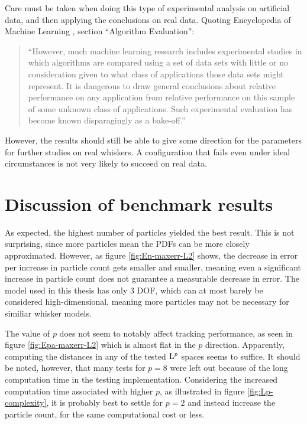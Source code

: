 

Care must be taken when doing this type of experimental analysis on
artificial data, and then applying the conclusions on real
data. Quoting Encyclopedia of Machine Learning
\cite{EncyclopediaMachineLearning}, section ``Algorithm Evaluation'':

\begin{quote}
  ``However, much machine learning research includes experimental
  studies in which algorithms are compared using a set of data sets
  with little or no consideration given to what class of applications
  those data sets might represent. It is dangerous to draw general
  conclusions about relative performance on any application from
  relative performance on this sample of some unknown class of
  applications. Such experimental evaluation has become known
  disparagingly as a bake-off.''
\end{quote}

However, the results should still be able to give some direction for
the parameters for further studies on real whiskers. A configuration
that fails even under ideal circumstances is not very likely to
succeed on real data.

\section{Discussion of benchmark results}
As expected, the highest number of particles yielded the best
result. This is not surprising, since more particles mean the PDFs can
be more closely approximated. However, as figure \ref{fig:En-maxerr-L2}
shows, the decrease in error per increase in particle count gets
smaller and smaller, meaning even a significant increase in particle
count does not guarantee a measurable decrease in error. The model
used in this thesis has only 3 DOF, which can at most barely be
considered high-dimensional, meaning more particles may not be
necessary for similiar whisker models.

The value of $p$ does not seem to notably affect tracking performance,
as seen in figure \ref{fig:Epa-maxerr-L2} which is almost flat in the
$p$ direction. Apparently, computing the distances in any of the
tested $\mathrm{L}^{p}$ spaces seems to suffice. It should be noted, however,
that many tests for $p=8$ were left out because of the long
computation time in the testing implementation. Considering the
increased computation time associated with higher $p$, as illustrated
in figure \ref{fig:Lp-complexity}, it is probably best to settle for
$p=2$ and instead increase the particle count, for the same
computational cost or less.

